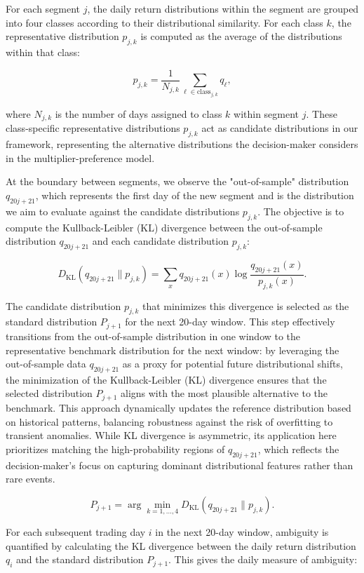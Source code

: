 \documentclass[preprint,12pt,authoryear]{elsarticle}
\begin{document}
For each segment \(j\), the daily return distributions within the segment are grouped into four classes according to their distributional similarity. For each class \(k\), the representative distribution \(p_{j,k}\) is computed as the average of the distributions within that class:

\[
p_{j,k} = \frac{1}{N_{j,k}} \sum_{\ell \in \text{class}_{j,k}} q_{\ell},
\]

where \(N_{j,k}\) is the number of days assigned to class \(k\) within segment \(j\). These class-specific representative distributions \(p_{j,k}\) act as candidate distributions in our framework, representing the alternative distributions the decision-maker considers in the multiplier-preference model.

At the boundary between segments, we observe the "out-of-sample" distribution \(q_{20j+21}\), which represents the first day of the new segment and is the distribution we aim to evaluate against the candidate distributions \(p_{j,k}\). The objective is to compute the Kullback-Leibler (KL) divergence between the out-of-sample distribution \(q_{20j+21}\) and each candidate distribution \(p_{j,k}\):

\[
D_{\mathrm{KL}}(q_{20j+21} \parallel p_{j,k}) = \sum_{x} q_{20j+21}(x) \log \frac{q_{20j+21}(x)}{p_{j,k}(x)}.
\]

The candidate distribution $p_{j,k}$ that minimizes this divergence is selected as the standard distribution $P_{j+1}$ for the next 20-day window. This step effectively transitions from the out-of-sample distribution in one window to the representative benchmark distribution for the next window:
by leveraging the out-of-sample data $q_{20j+21}$ as a proxy for potential future distributional shifts, the minimization of the Kullback-Leibler (KL) divergence ensures that the selected distribution $P_{j+1}$ aligns with the most plausible alternative to the benchmark. This approach dynamically updates the reference distribution based on historical patterns, balancing robustness against the risk of overfitting to transient anomalies. While KL divergence is asymmetric, its application here prioritizes matching the high-probability regions of $q_{20j+21}$, which reflects the decision-maker's focus on capturing dominant distributional features rather than rare events.

\[
P_{j+1} = \arg\min_{k=1,\dots,4} D_{\mathrm{KL}}(q_{20j+21} \parallel p_{j,k}).
\]

For each subsequent trading day \(i\) in the next 20-day window, ambiguity is quantified by calculating the KL divergence between the daily return distribution \(q_i\) and the standard distribution \(P_{j+1}\). This gives the daily measure of ambiguity:
\end{document}
